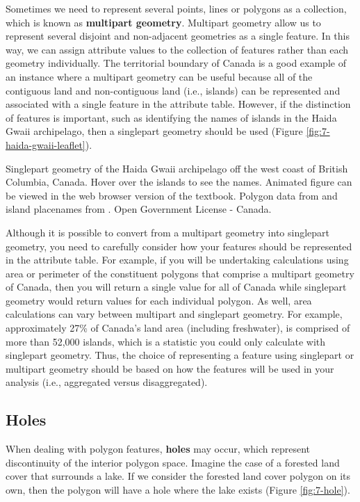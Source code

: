 \documentclass[
]{book}
\begin{document}
Sometimes we need to represent several points, lines or polygons as a collection, which is known as \textbf{multipart geometry}. Multipart geometry allow us to represent several disjoint and non-adjacent geometries as a single feature. In this way, we can assign attribute values to the collection of features rather than each geometry individually. The territorial boundary of Canada is a good example of an instance where a multipart geometry can be useful because all of the contiguous land and non-contiguous land (i.e., islands) can be represented and associated with a single feature in the attribute table. However, if the distinction of features is important, such as identifying the names of islands in the Haida Gwaii archipelago, then a singlepart geometry should be used (Figure \ref{fig:7-haida-gwaii-leaflet}).

\label{fig:7-haida-gwaii-leaflet}Singlepart geometry of the Haida Gwaii archipelago off the west coast of British Columbia, Canada. Hover over the islands to see the names. Animated figure can be viewed in the web browser version of the textbook. Polygon data from \citet{statistics_canada_statistics_nodate} and island placenames from \citet{natural_resources_canada_natural_nodate}. Open Government License - Canada.

Although it is possible to convert from a multipart geometry into singlepart geometry, you need to carefully consider how your features should be represented in the attribute table. For example, if you will be undertaking calculations using area or perimeter of the constituent polygons that comprise a multipart geometry of Canada, then you will return a single value for all of Canada while singlepart geometry would return values for each individual polygon. As well, area calculations can vary between multipart and singlepart geometry. For example, approximately 27\% of Canada's land area (including freshwater), is comprised of more than 52,000 islands, which is a statistic you could only calculate with singlepart geometry. Thus, the choice of representing a feature using singlepart or multipart geometry should be based on how the features will be used in your analysis (i.e., aggregated versus disaggregated).

\subsection{Holes}\label{holes}

When dealing with polygon features, \textbf{holes} may occur, which represent discontinuity of the interior polygon space. Imagine the case of a forested land cover that surrounds a lake. If we consider the forested land cover polygon on its own, then the polygon will have a hole where the lake exists (Figure \ref{fig:7-hole}).
\end{document}
